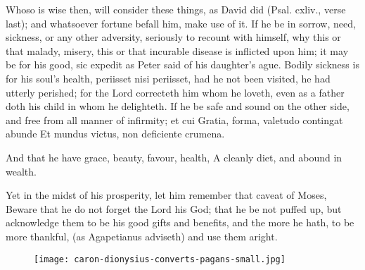 {Whoso is wise then, will consider these things, as David did (Psal. cxliv., verse last); and whatsoever fortune befall him, make use of it.
If he be in sorrow, need, sickness, or any other adversity, seriously to recount with himself, why this or that malady, misery, this or that incurable disease is inflicted upon him; it may be for his good, sic expedit as Peter said of his daughter's ague.
Bodily sickness is for his soul's health, periisset nisi periisset, had he not been visited, he had utterly perished; for the Lord correcteth him whom he loveth, even as a father doth his child in whom he delighteth.
If he be safe and sound on the other side, and free from all manner of infirmity; et cui Gratia, forma, valetudo contingat abunde Et mundus victus, non deficiente crumena.

And that he have grace, beauty, favour, health,
A cleanly diet, and abound in wealth.

Yet in the midst of his prosperity, let him remember that caveat of
Moses, Beware that he do not forget the Lord his God; that he be
not puffed up, but acknowledge them to be his good gifts and benefits,
and the more he hath, to be more thankful, (as Agapetianus
adviseth) and use them aright.

\cleartoleftpage{}
\begin{figure}[p]
  \begingroup
  \centering
  \texttt{[image: caron-dionysius-converts-pagans-small.jpg]}
  \label{fig:dionysiusconvertspagans}
\end{figure}
\restoregeometry

\clearpage{}
}
